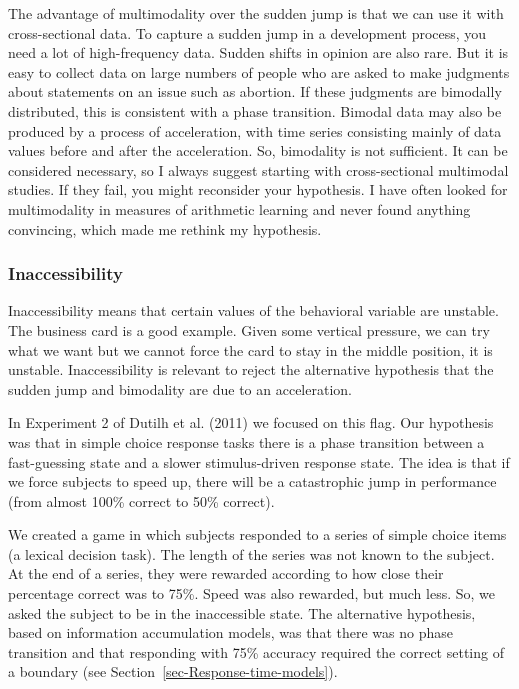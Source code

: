 \documentclass[
  a4paper,
  DIV=11,
  numbers=noendperiod,
  oneside]{scrreprt}
\begin{document}
The advantage of multimodality over the sudden jump is that we can use
it with cross-sectional data. To capture a sudden jump in a development
process, you need a lot of high-frequency data. Sudden shifts in opinion
are also rare. But it is easy to collect data on large numbers of people
who are asked to make judgments about statements on an issue such as
abortion. If these judgments are bimodally distributed, this is
consistent with a phase transition. Bimodal data may also be produced by
a process of acceleration, with time series consisting mainly of data
values before and after the acceleration. So, bimodality is not
sufficient. It can be considered necessary, so I always suggest starting
with cross-sectional multimodal studies. If they fail, you might
reconsider your hypothesis. I have often looked for multimodality in
measures of arithmetic learning and never found anything convincing,
which made me rethink my hypothesis.

\hypertarget{sec-Inaccessibility}{%
\subsubsection{Inaccessibility}\label{sec-Inaccessibility}}

Inaccessibility means that certain values of the behavioral variable are
unstable. The business card is a good example. Given some vertical
pressure, we can try what we want but we cannot force the card to stay
in the middle position, it is unstable. Inaccessibility is relevant to
reject the alternative hypothesis that the sudden jump and bimodality
are due to an acceleration.

In Experiment 2 of Dutilh et al. (2011) we focused on this flag. Our
hypothesis was that in simple choice response tasks there is a phase
transition between a fast-guessing state and a slower stimulus-driven
response state. The idea is that if we force subjects to speed up, there
will be a catastrophic jump in performance (from almost 100\% correct to
50\% correct).

We created a game in which subjects responded to a series of simple
choice items (a lexical decision task). The length of the series was not
known to the subject. At the end of a series, they were rewarded
according to how close their percentage correct was to 75\%. Speed was
also rewarded, but much less. So, we asked the subject to be in the
inaccessible state. The alternative hypothesis, based on information
accumulation models, was that there was no phase transition and that
responding with 75\% accuracy required the correct setting of a boundary
(see Section~\ref{sec-Response-time-models}).
\end{document}
